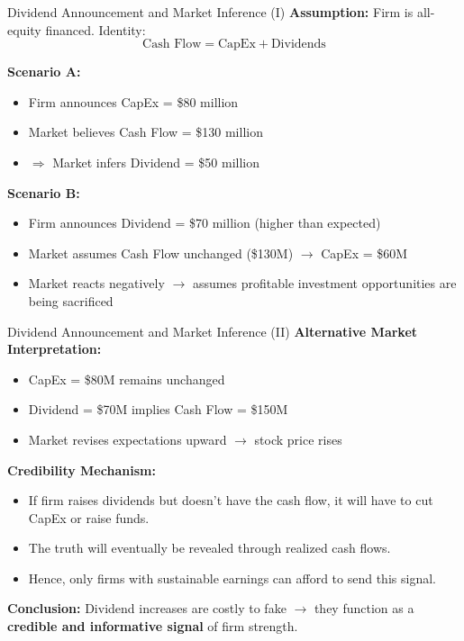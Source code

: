 \begin{frame}{Dividend Announcement and Market Inference (I)}
\footnotesize
\textbf{Assumption:}  
Firm is all-equity financed. Identity:
\[
\text{Cash Flow} = \text{CapEx} + \text{Dividends}
\]

\vspace{2mm}
\textbf{Scenario A:}
\begin{itemize}
    \item Firm announces CapEx = \$80 million
    \item Market believes Cash Flow = \$130 million
    \item $\Rightarrow$ Market infers Dividend = \$50 million
\end{itemize}

\vspace{2mm}
\textbf{Scenario B:}
\begin{itemize}
    \item Firm announces Dividend = \$70 million (higher than expected)
    \item Market assumes Cash Flow unchanged (\$130M) $\rightarrow$ CapEx = \$60M
    \item Market reacts negatively $\rightarrow$ assumes profitable investment opportunities are being sacrificed
\end{itemize}
\end{frame}

\begin{frame}{Dividend Announcement and Market Inference (II)}
\footnotesize
\textbf{Alternative Market Interpretation:}
\begin{itemize}
    \item CapEx = \$80M remains unchanged
    \item Dividend = \$70M implies Cash Flow = \$150M
    \item Market revises expectations upward $\rightarrow$ stock price rises
\end{itemize}

\vspace{2mm}
\textbf{Credibility Mechanism:}
\begin{itemize}
    \item If firm raises dividends but doesn't have the cash flow, it will have to cut CapEx or raise funds.
    \item The truth will eventually be revealed through realized cash flows.
    \item Hence, only firms with sustainable earnings can afford to send this signal.
\end{itemize}

\vspace{2mm}
\textbf{Conclusion:}  
Dividend increases are costly to fake $\rightarrow$ they function as a \textbf{credible and informative signal} of firm strength.
\end{frame}

